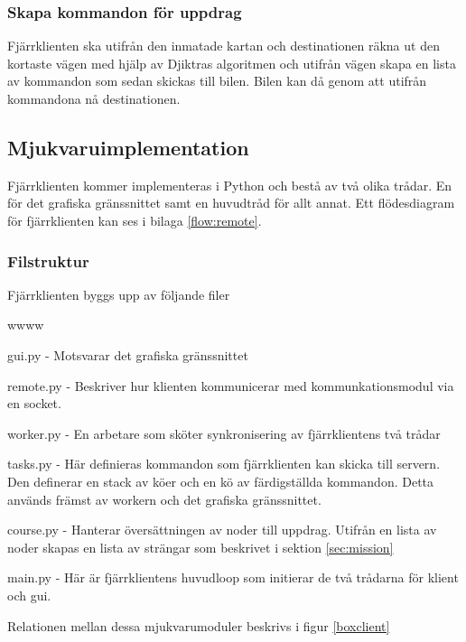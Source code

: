 \documentclass[tekniskrapport/tech.tex]{subfiles}
\begin{document}
\subsubsection{Skapa kommandon för uppdrag}
Fjärrklienten ska utifrån den inmatade kartan och destinationen räkna ut den
kortaste vägen med hjälp av Djiktras algoritmen och utifrån vägen skapa en
lista av kommandon som sedan skickas till bilen. Bilen kan då genom att utifrån
kommandona nå destinationen.

\subsection{Mjukvaruimplementation}
Fjärrklienten kommer implementeras i Python och bestå av två olika trådar. En
för det grafiska gränssnittet samt en huvudtråd för allt annat. Ett
flödesdiagram för fjärrklienten kan ses i bilaga \ref{flow:remote}.

\subsubsection{Filstruktur}
Fjärrklienten byggs upp av följande filer

\begin{labeling}{wwww}
	\item[gui.py] - Motsvarar det grafiska gränssnittet
	
	\item[remote.py] - Beskriver hur klienten kommunicerar med
		kommunkationsmodul via en socket.

	\item[worker.py] - En arbetare som sköter synkronisering av
		fjärrklientens två trådar
	
	\item[tasks.py] - Här definieras kommandon som fjärrklienten kan skicka
		till servern. Den definerar en stack av köer och en kö av
		färdigställda kommandon.  Detta används främst av workern och
		det grafiska gränssnittet.
    
    \item[course.py] - Hanterar översättningen av noder till uppdrag. Utifrån
    en lista av noder skapas en lista av strängar som beskrivet i sektion
    \ref{sec:mission}

    \item[main.py] - Här är fjärrklientens huvudloop som initierar de två
    trådarna för klient och gui.

\end{labeling}
Relationen mellan dessa mjukvarumoduler beskrivs i figur \ref{boxclient}
\end{document}
